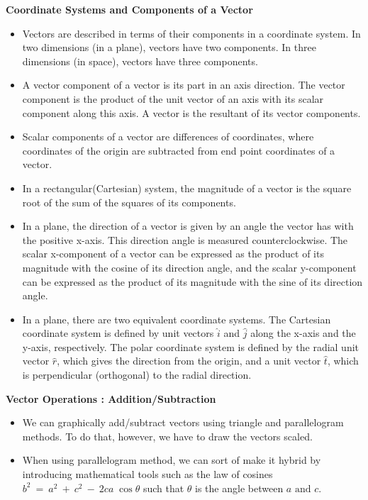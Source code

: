 \documentclass[12pt,addpoints]{exam}
\begin{document}
\begin{questions}
\begin{center}
			\textbf{Coordinate Systems and Components of a Vector} 
		\end{center}
		\begin{itemize}
			\item Vectors are described in terms of their components in a coordinate system. In two dimensions (in a plane), vectors have two components. In three dimensions (in space), vectors have three components.
			\item A vector component of a vector is its part in an axis direction. The vector component is the product of the unit vector of an axis with its scalar component along this axis. A vector is the resultant of its vector components.
			\item Scalar components of a vector are differences of coordinates, where coordinates of the origin are subtracted from end point coordinates of a vector. \item In a rectangular(Cartesian) system, the magnitude of a vector is the square root of the sum of the squares of its components.
			\item In a plane, the direction of a vector is given by an angle the vector has with the positive x-axis. This direction angle is measured counterclockwise. The scalar x-component of a vector can be expressed as the product of its magnitude with the cosine of its direction angle, and the scalar y-component can be expressed as the product of its magnitude with the sine of its direction angle.
			\item In a plane, there are two equivalent coordinate systems. The Cartesian coordinate system is defined by unit vectors  $\hat{i}$ and  $\hat{j}$
			along the x-axis and the y-axis, respectively. The polar coordinate system is defined by the radial unit vector  $\hat{r}$, which gives the direction from the origin, and a unit vector  $\hat{t}$, which is perpendicular (orthogonal) to the radial direction.
		\end{itemize}
		\begin{center}
			\textbf{Vector Operations : Addition/Subtraction} 
		\end{center}
		\begin{itemize}
			\item We can graphically add/subtract vectors using triangle and parallelogram methods. To do that, however, we have to draw the vectors scaled.
			\item When using parallelogram method, we can sort of make it hybrid by introducing mathematical tools such as the law of cosines $b^2 ~=~ a^2 ~+~ c^2 ~-~ 2ca\;\cos\theta$ such that $\theta$ is the angle between $a\text{ and }c$. 

\end{itemize}
\end{questions}
\end{document}

